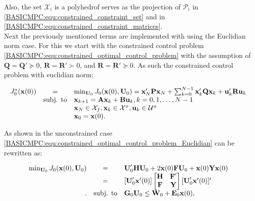     Also, the set $\mathcal{X}_i$ is a polyhedrof serves as the projection of $\mathcal{P}_i$ in \ref{BASICMPC:equ:constrained_constraint_set} and in \ref{BASICMPC:equ:constrained_constraint_matrices}.\\
    Next the previously mentioned terms are implemented with using the Euclidian norm case. For this we start with the constrained control problem \ref{BASICMPC:equ:constrained_optimal_control_problem} with the assumption of $\textbf{Q}=\textbf{Q}'\succeq0$, $\textbf{R}=\textbf{R}'\succ0$, and $\textbf{R}=\textbf{R}'\succeq0$. As such the constrained control problem with euclidian norm:

    \begin{equation}
        \begin{array}{rcl}
            J^*_0(\textbf{x}(0))&=&\min_{\textbf{U}_0}J_0(\textbf{x}(0),\textbf{U}_0)=
            \textbf{x}'_N\textbf{P}\textbf{x}_N+\sum^{N-1}_{k=0}\textbf{x}'_k\textbf{Q}\textbf{x}_k+\textbf{u}'_k\textbf{R}\textbf{u}_k\\
            &\textnormal{subj. to}&\textbf{x}_{k+1}=\textbf{Ax}_{k}+\textbf{Bu}_{k},k=0,1,\dots,N-1\\
            &&\textbf{x}_N\in\mathcal{X}_f,\textbf{x}_k\in\mathcal{X}^x,\textbf{u}_k\in\mathcal{U}^u\\
            &&\textbf{x}_0=\textbf{x}(0).
        \end{array}
        \label{BASICMPC:equ:constrained_optimal_control_problem_Euclidian}
    \end{equation}

    As shown in the unconstrained case \ref{BASICMPC:equ:constrained_optimal_control_problem_Euclidian} can be rewritten as:

\begin{equation}
    \begin{array}{rcl}
            \min_{\textbf{U}_0}J_0(\textbf{x}(0),\textbf{U}_0)&=& \textbf{U}'_0\textbf{H}\textbf{U}_0+2\textbf{x}(0)\textbf{F}\textbf{U}_0+\textbf{x}(0)\textbf{Y}\textbf{x}(0)\\
            &=&[\textbf{U}'_0\textbf{x}'(0)]
            \begin{bmatrix}
            \textbf{H}&\textbf{F}'\\
            \textbf{F}&\textbf{Y}\\
            \end{bmatrix}
            [\textbf{U}'_0\textbf{x}'(0)]'\\.
            &\textnormal{subj. to}&\textbf{G}_0\textbf{U}_0\leq\textbf{W}_0+\textbf{E}_0\textbf{x}(0),
        \end{array}
        \label{BASICMPC:equ:constrained_optimal_control_problem_Euclidian_second form}
    \end{equation}

